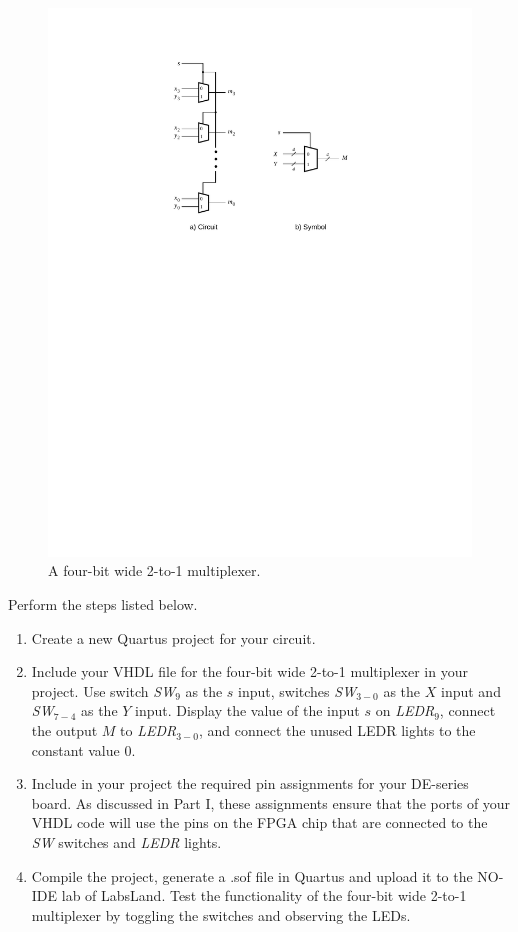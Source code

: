 \documentclass[epsfig,10pt,fullpage]{article}
\begin{document}
\begin{figure}[htb]
	\begin{center}
		\includegraphics[scale=.8]{figures/figure3.pdf}
	\end{center}
\caption{A four-bit wide 2-to-1 multiplexer.}
\label{fig:3}
\end{figure}

Perform the steps listed below.
\begin{enumerate}
\item Create a new Quartus  project for your circuit.
\item Include your VHDL file for the four-bit wide 2-to-1 multiplexer 
in your project. Use switch {\it SW}$_{9}$ as the $s$ input, switches
{\it SW}$_{3-0}$ as the $X$ input and 
{\it SW}$_{7-4}$ as the $Y$ input. Display the value of the input $s$ on {\it LEDR}$_9$,
connect the output $M$ to {\it LEDR}$_{3-0}$, and connect the unused LEDR lights to the constant value 0.
\item Include in your project the required pin assignments for your DE-series board. As discussed
in Part I, these assignments ensure that the ports of your VHDL code will use the pins 
on the FPGA chip that are connected to the {\it SW} switches and {\it LEDR} lights. 
\item Compile the project, generate a .sof file in Quartus and upload it to the NO-IDE lab of LabsLand.
Test the functionality of the 
four-bit wide 2-to-1 multiplexer by toggling the switches and observing the LEDs.
\end{enumerate}
\end{document}
